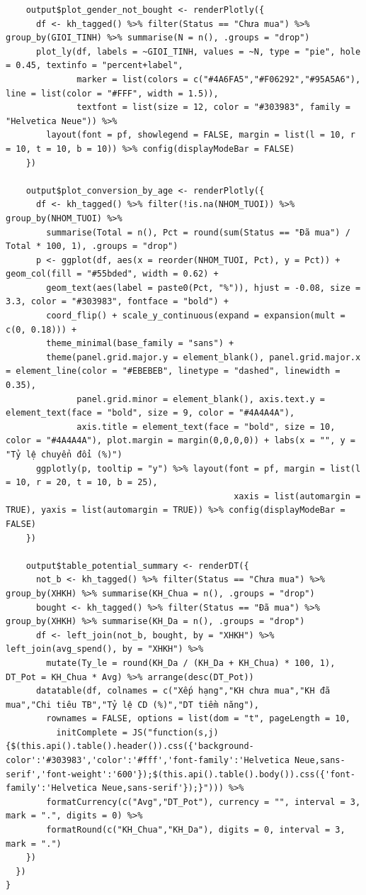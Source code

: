 \documentclass[12pt, a4paper]{article}
\begin{document}
\begin{lstlisting}
    output$plot_gender_not_bought <- renderPlotly({
      df <- kh_tagged() %>% filter(Status == "Chưa mua") %>% group_by(GIOI_TINH) %>% summarise(N = n(), .groups = "drop")
      plot_ly(df, labels = ~GIOI_TINH, values = ~N, type = "pie", hole = 0.45, textinfo = "percent+label",
              marker = list(colors = c("#4A6FA5","#F06292","#95A5A6"), line = list(color = "#FFF", width = 1.5)),
              textfont = list(size = 12, color = "#303983", family = "Helvetica Neue")) %>%
        layout(font = pf, showlegend = FALSE, margin = list(l = 10, r = 10, t = 10, b = 10)) %>% config(displayModeBar = FALSE)
    })

    output$plot_conversion_by_age <- renderPlotly({
      df <- kh_tagged() %>% filter(!is.na(NHOM_TUOI)) %>% group_by(NHOM_TUOI) %>%
        summarise(Total = n(), Pct = round(sum(Status == "Đã mua") / Total * 100, 1), .groups = "drop")
      p <- ggplot(df, aes(x = reorder(NHOM_TUOI, Pct), y = Pct)) + geom_col(fill = "#55bded", width = 0.62) +
        geom_text(aes(label = paste0(Pct, "%")), hjust = -0.08, size = 3.3, color = "#303983", fontface = "bold") +
        coord_flip() + scale_y_continuous(expand = expansion(mult = c(0, 0.18))) +
        theme_minimal(base_family = "sans") +
        theme(panel.grid.major.y = element_blank(), panel.grid.major.x = element_line(color = "#EBEBEB", linetype = "dashed", linewidth = 0.35),
              panel.grid.minor = element_blank(), axis.text.y = element_text(face = "bold", size = 9, color = "#4A4A4A"),
              axis.title = element_text(face = "bold", size = 10, color = "#4A4A4A"), plot.margin = margin(0,0,0,0)) + labs(x = "", y = "Tỷ lệ chuyển đổi (%)")
      ggplotly(p, tooltip = "y") %>% layout(font = pf, margin = list(l = 10, r = 20, t = 10, b = 25),
                                             xaxis = list(automargin = TRUE), yaxis = list(automargin = TRUE)) %>% config(displayModeBar = FALSE)
    })

    output$table_potential_summary <- renderDT({
      not_b <- kh_tagged() %>% filter(Status == "Chưa mua") %>% group_by(XHKH) %>% summarise(KH_Chua = n(), .groups = "drop")
      bought <- kh_tagged() %>% filter(Status == "Đã mua") %>% group_by(XHKH) %>% summarise(KH_Da = n(), .groups = "drop")
      df <- left_join(not_b, bought, by = "XHKH") %>% left_join(avg_spend(), by = "XHKH") %>%
        mutate(Ty_le = round(KH_Da / (KH_Da + KH_Chua) * 100, 1), DT_Pot = KH_Chua * Avg) %>% arrange(desc(DT_Pot))
      datatable(df, colnames = c("Xếp hạng","KH chưa mua","KH đã mua","Chi tiêu TB","Tỷ lệ CD (%)","DT tiềm năng"),
        rownames = FALSE, options = list(dom = "t", pageLength = 10,
          initComplete = JS("function(s,j){$(this.api().table().header()).css({'background-color':'#303983','color':'#fff','font-family':'Helvetica Neue,sans-serif','font-weight':'600'});$(this.api().table().body()).css({'font-family':'Helvetica Neue,sans-serif'});}"))) %>%
        formatCurrency(c("Avg","DT_Pot"), currency = "", interval = 3, mark = ".", digits = 0) %>%
        formatRound(c("KH_Chua","KH_Da"), digits = 0, interval = 3, mark = ".")
    })
  })
}
\end{lstlisting}
\newpage
\end{document}
